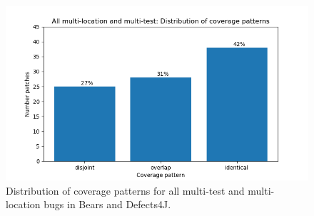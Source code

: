 \begin{figure}
	\includegraphics[width=\linewidth]{img/coverage-all.png}
	\caption{Distribution of coverage patterns for all multi-test and 
	multi-location bugs in Bears and Defects4J.}
	\label{fig:coverage-all}
\end{figure}


